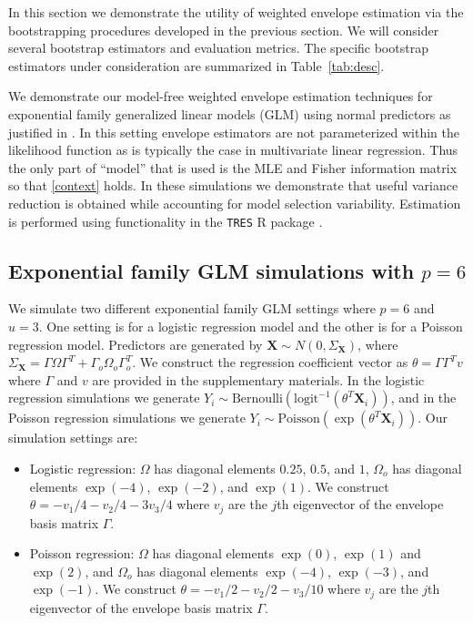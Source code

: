 \documentclass{article}\usepackage[]{graphicx}\usepackage[]{color}
\newcommand{\X}{\mathbf{X}}
\begin{document}
In this section we demonstrate the utility of weighted envelope estimation via the bootstrapping procedures developed in the previous section. We will consider several bootstrap estimators and evaluation metrics. The specific bootstrap estimators under consideration are summarized in Table~\ref{tab:desc}.

We demonstrate our model-free weighted envelope estimation techniques for exponential family generalized linear models (GLM) using normal predictors as justified in \cite{found}. In this setting envelope estimators are not parameterized within the likelihood function as is typically the case in multivariate linear regression. Thus the only part of ``model'' that is used is the MLE and Fisher information matrix so that \eqref{context} holds. In these simulations we demonstrate that useful variance reduction is obtained while accounting for model selection variability. Estimation is performed using functionality in the \texttt{TRES} R package \citep{zeng2019TRES}. 


\subsection{Exponential family GLM simulations with $p=6$} 
\label{sec:examplep6}

We simulate two different exponential family GLM settings where $p = 6$ and $u = 3$. One setting is for a logistic regression model and the other is for a Poisson regression model. Predictors are generated by $\X \sim N(0, \Sigma_{\X})$, where $\Sigma_{\X} = \Gamma\Omega\Gamma^T + \Gamma_o\Omega_o\Gamma_o^T$. We construct the regression coefficient vector as $\theta = \Gamma\Gamma^T v$ where $\Gamma$ and $v$ are provided in the supplementary materials. In the logistic regression simulations we generate $Y_i \sim \text{Bernoulli}(\text{logit}^{-1}(\theta^T\X_i))$, and in the Poisson regression simulations we generate $Y_i \sim \text{Poisson}(\exp(\theta^T\X_i))$. Our simulation settings are: 

\begin{itemize}
	\item Logistic regression: $\Omega$ has diagonal elements $0.25$, $0.5$, and $1$, $\Omega_o$ has diagonal elements $\exp(-4)$, $\exp(-2)$, and $\exp(1)$. We construct $\theta = -v_1/4 - v_2/4 - 3v_3/4$ where $v_j$ are the $j$th eigenvector of the envelope basis matrix $\Gamma$.
	\item Poisson regression: $\Omega$ has diagonal elements $\exp(0)$, $\exp(1)$ and $\exp(2)$, and $\Omega_o$ has diagonal elements $\exp(-4)$, $\exp(-3)$, and $\exp(-1)$. We construct $\theta = -v_1/2 - v_2/2 - v_3/10$ where $v_j$ are the $j$th eigenvector of the envelope basis matrix $\Gamma$.
\end{itemize}
\end{document}
